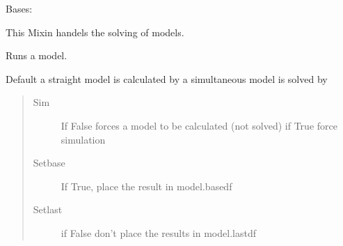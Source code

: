 \documentclass[letterpaper,10pt,english]{sphinxmanual}
\begin{document}
\begin{fulllineitems}
\label{\detokenize{core/modelclass:modelclass.Solver_Mixin}}
\pysigstartsignatures
{}
\pysigstopsignatures
\sphinxAtStartPar
Bases: 

\sphinxAtStartPar
This Mixin handels the solving of models.

\begin{fulllineitems}
\label{\detokenize{core/modelclass:modelclass.Solver_Mixin.DEFAULT_relconv}}
\pysigstartsignatures
{}
\pysigstopsignatures
\end{fulllineitems}


\begin{fulllineitems}
\label{\detokenize{core/modelclass:modelclass.Solver_Mixin.__call__}}
\pysigstartsignatures
{}
\pysigstopsignatures
\sphinxAtStartPar
Runs a model.

\sphinxAtStartPar
Default a straight model is calculated by  a simultaneous model is solved by 
\begin{quote}\begin{description}
\item[{Sim}] \leavevmode
\sphinxAtStartPar
If False forces a  model to be calculated (not solved) if True force simulation

\item[{Setbase}] \leavevmode
\sphinxAtStartPar
If True, place the result in model.basedf

\item[{Setlast}] \leavevmode
\sphinxAtStartPar
if False don’t place the results in model.lastdf

\end{description}\end{quote}


\end{fulllineitems}
\end{fulllineitems}
\end{document}
